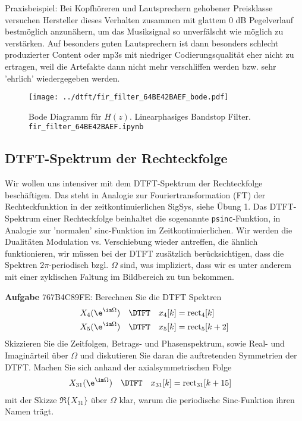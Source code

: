 Praxisbeispiel:
Bei Kopfhöreren und Lautsprechern gehobener Preisklasse versuchen Hersteller
dieses Verhalten zusammen mit glattem 0 dB Pegelverlauf bestmöglich anzunähern,
um das Musiksignal so unverfälscht wie möglich zu verstärken.
%
Auf besonders guten Lautsprechern ist dann besonders schlecht produzierter
Content oder mp3s mit niedriger Codierungsqualität eher nicht zu ertragen, weil
die Artefakte dann nicht mehr verschliffen werden bzw. sehr 'ehrlich'
wiedergegeben werden.
%


\begin{figure}
\centering
\texttt{[image: ../dtft/fir\_filter\_64BE42BAEF\_bode.pdf]}
\caption{Bode Diagramm für $H(z)$. Linearphasiges Bandstop Filter.
\texttt{fir\_filter\_64BE42BAEF.ipynb}}
\label{fig:fir_filter_64BE42BAEF_bode}
\end{figure}










\clearpage
\subsection{DTFT-Spektrum der Rechteckfolge}
\label{sec:767B4C89FE}
\begin{Ziel}
Wir wollen uns intensiver mit dem DTFT-Spektrum der Rechteckfolge beschäftigen.
Das steht in Analogie zur Fouriertransformation (FT) der Rechteckfunktion in
der zeitkontinuierlichen SigSys, siehe Übung 1.
Das DTFT-Spektrum einer Rechteckfolge beinhaltet die sogenannte \texttt{psinc}-Funktion,
in Analogie zur 'normalen' sinc-Funktion im Zeitkontinuierlichen.
%
Wir werden die Dualitäten Modulation vs. Verschiebung wieder antreffen, die ähnlich
funktionieren, wir müssen bei der DTFT zusätzlich berücksichtigen, dass
die Spektren $2\pi$-periodisch bzgl. $\Omega$ sind, was impliziert, dass
wir es unter anderem mit einer zyklischen Faltung im Bildbereich zu tun bekommen.
%
\end{Ziel}
\textbf{Aufgabe} {\tiny 767B4C89FE}: Berechnen Sie die DTFT Spektren
\begin{align}
X_4(\e^{\im\Omega}) \quad\DTFT\quad & x_4[k] = \mathrm{rect}_4[k]\\
X_5(\e^{\im\Omega}) \quad\DTFT\quad & x_5[k] = \mathrm{rect}_5[k+2]
\end{align}
Skizzieren Sie die Zeitfolgen, Betrags- und Phasenspektrum, sowie
Real- und Imaginärteil über $\Omega$ und diskutieren Sie daran die auftretenden
Symmetrien der DTFT.
%
Machen Sie sich anhand der axialsymmetrischen Folge
\begin{align}
X_{31}(\e^{\im\Omega}) \quad\DTFT\quad & x_{31}[k] = \mathrm{rect}_{31}[k+15]
\end{align}
mit der Skizze $\Re\{X_{31}\}$ über $\Omega$ klar, warum die periodische
Sinc-Funktion ihren Namen trägt.


